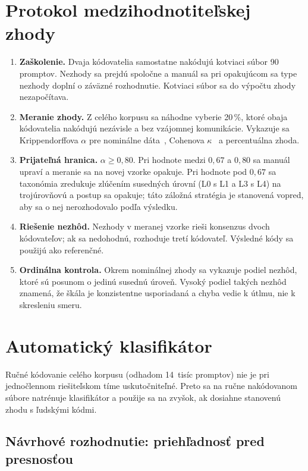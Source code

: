 \section{Protokol medzihodnotiteľskej zhody}

\begin{enumerate}[nosep]
    \item \textbf{Zaškolenie.} Dvaja kódovatelia samostatne nakódujú kotviaci súbor 90 promptov. Nezhody sa prejdú spoločne a manuál sa pri opakujúcom sa type nezhody doplní o záväzné rozhodnutie. Kotviaci súbor sa do výpočtu zhody nezapočítava.
    \item \textbf{Meranie zhody.} Z celého korpusu sa náhodne vyberie 20\,\%, ktoré obaja kódovatelia nakódujú nezávisle a bez vzájomnej komunikácie. Vykazuje sa Krippendorffova $\alpha$ pre nominálne dáta~\cite{krippendorff2004content}, Cohenova $\kappa$~\cite{landis1977kappa} a percentuálna zhoda.
    \item \textbf{Prijateľná hranica.} $\alpha \geq 0{,}80$. Pri hodnote medzi $0{,}67$ a $0{,}80$ sa manuál upraví a meranie sa na novej vzorke opakuje. Pri hodnote pod $0{,}67$ sa taxonómia zredukuje zlúčením susedných úrovní (L0 s L1 a L3 s L4) na trojúrovňovú a postup sa opakuje; táto záložná stratégia je stanovená vopred, aby sa o nej nerozhodovalo podľa výsledku.
    \item \textbf{Riešenie nezhôd.} Nezhody v meranej vzorke rieši konsenzus dvoch kódovateľov; ak sa nedohodnú, rozhoduje tretí kódovateľ. Výsledné kódy sa použijú ako referenčné.
    \item \textbf{Ordinálna kontrola.} Okrem nominálnej zhody sa vykazuje podiel nezhôd, ktoré sú posunom o jedinú susednú úroveň. Vysoký podiel takých nezhôd znamená, že škála je konzistentne usporiadaná a chyba vedie k útlmu, nie k skresleniu smeru.
\end{enumerate}

\section{Automatický klasifikátor}

Ručné kódovanie celého korpusu (odhadom 14~tisíc promptov) nie je pri jednočlennom riešiteľskom tíme uskutočniteľné. Preto sa na ručne nakódovanom súbore natrénuje klasifikátor a použije sa na zvyšok, ak dosiahne stanovenú zhodu s ľudskými kódmi.

\subsection{Návrhové rozhodnutie: priehľadnosť pred presnosťou}

